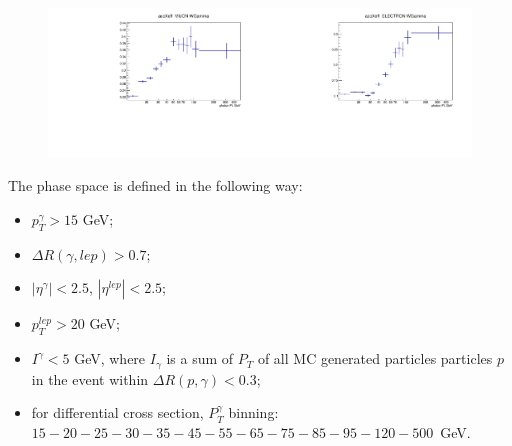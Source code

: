 \begin{figure}[htb]
  \begin{center}
  \includegraphics[width=0.5\textwidth]{../figs/figs_v11/MUON_WGamma/Constants/C_accXeff_MUON_WGamma.pdf}\includegraphics[width=0.5\textwidth]{../figs/figs_v11/ELECTRON_WGamma/Constants/C_accXeff_ELECTRON_WGamma.pdf}\\
  \label{fig:covMatricesaccXeff_Wg}
  \end{center}
\end{figure}


The phase space is defined in the following way:
  \begin{itemize}
  \item $p_T^{\gamma}>15$ GeV;
  \item $\Delta{R}(\gamma,lep) > 0.7$;
  \item $|\eta^{\gamma}|<2.5$, $|\eta^{lep}|<2.5$;
  \item $p_T^{lep}>20$ GeV;
  \item $I^{\gamma}<5$ GeV, where $I_{\gamma}$ is a sum of $P_T$ of all MC generated particles particles $p$ in the event within $\Delta{R(p,\gamma)}<0.3$;
  \item for differential cross section, $P_T^{\gamma}$ binning: $15-20-25-30-35-45-55-65-75-85-95-120-500$~GeV.
  \end{itemize}

